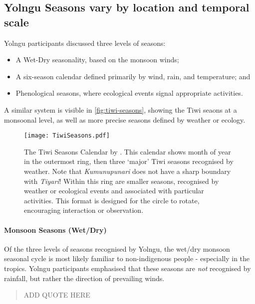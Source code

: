 \subsection{Yolngu Seasons vary by location and temporal scale}

Yolngu participants discussed three levels of seasons:
\begin{itemize}
\item A Wet-Dry seasonality, based on the monsoon winds;
\item A six-season calendar defined primarily by wind, rain, and temperature; and
\item Phenological seasons, where ecological events signal appropriate activities.
\end{itemize}

A similar system is visible in \autoref{fig:tiwi-seasons}, showing the Tiwi seaons at
a monsoonal level, as well as more precise seasons defined by weather or ecology.


\begin{landscape}
\begin{figure}[p]
    \centering
    \texttt{[image: TiwiSeasons.pdf]}
    \caption[The Tiwi Seasons Calendar by \citet{CSIROcals}]{
        The Tiwi Seasons Calendar by \citet{CSIROcals}.
        This calendar shows month of year in the outermost ring,
        then three `major' Tiwi seasons recognised by weather.
        Note that \textit{Kumunupunari} does not have a sharp boundary with \textit{Tiyari}!
        Within this ring are smaller seasons, recognised by weather
        or ecological events and associated with particular activities.
        This format is designed for the circle to rotate, encouraging interaction or observation.
        }
    \label{fig:tiwi-seasons}
\end{figure}
\end{landscape}


\paragraph{Monsoon Seasons (Wet/Dry)}

Of the three levels of seasons recognised by Yolngu,
the wet/dry monsoon seasonal cycle is most likely familiar to non-indigenous people -
especially in the tropics.  Yolngu participants emphasised that these seasons
are \emph{not} recognised by rainfall, but rather the direction of prevailing winds.

\blockquote{
    ADD QUOTE HERE
}


